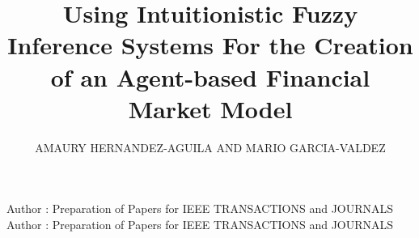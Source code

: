 \documentclass{ieeeaccess}
\begin{document}

\title{Using Intuitionistic Fuzzy Inference Systems For the Creation
of an Agent-based Financial Market Model}
\author{
  \uppercase{Amaury Hernandez-Aguila
    and
    \uppercase{Mario Garcia-Valdez}}}
\address[1]{National Institute of Standards and 
Technology, Boulder, CO 80305 USA (e-mail: author@boulder.nist.gov)}
\address[2]{Department of Physics, Colorado State University, Fort Collins, 
  CO 80523 USA (e-mail: author@lamar.colostate.edu)}

\markboth
{Author \headeretal: Preparation of Papers for IEEE TRANSACTIONS and JOURNALS}
{Author \headeretal: Preparation of Papers for IEEE TRANSACTIONS and JOURNALS}

\end{document}

